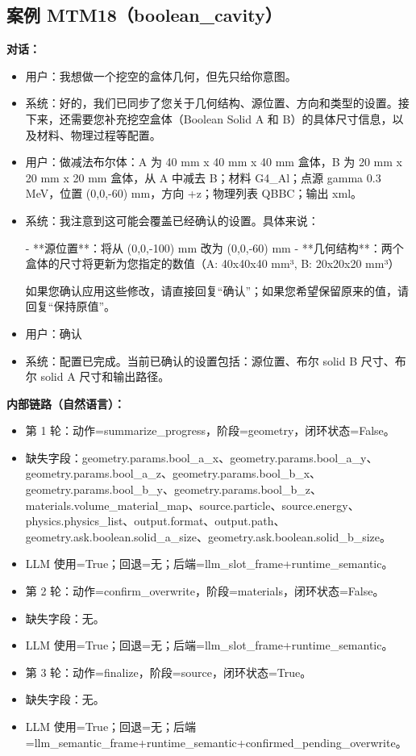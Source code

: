 \documentclass[11pt]{ctexart}
\begin{document}
\subsection{案例 MTM18（boolean\_cavity）}
\textbf{对话：}
\begin{itemize}
\item 用户：我想做一个挖空的盒体几何，但先只给你意图。
\item 系统：好的，我们已同步了您关于几何结构、源位置、方向和类型的设置。接下来，还需要您补充挖空盒体（Boolean Solid A 和 B）的具体尺寸信息，以及材料、物理过程等配置。
\item 用户：做减法布尔体：A 为 40 mm x 40 mm x 40 mm 盒体，B 为 20 mm x 20 mm x 20 mm 盒体，从 A 中减去 B；材料 G4\_Al；点源 gamma 0.3 MeV，位置 (0,0,-60) mm，方向 +z；物理列表 QBBC；输出 xml。
\item 系统：我注意到这可能会覆盖已经确认的设置。具体来说：

- **源位置**：将从 (0,0,-100) mm 改为 (0,0,-60) mm
- **几何结构**：两个盒体的尺寸将更新为您指定的数值（A: 40x40x40 mm³, B: 20x20x20 mm³）

如果您确认应用这些修改，请直接回复“确认”；如果您希望保留原来的值，请回复“保持原值”。
\item 用户：确认
\item 系统：配置已完成。当前已确认的设置包括：源位置、布尔 solid B 尺寸、布尔 solid A 尺寸和输出路径。
\end{itemize}
\textbf{内部链路（自然语言）：}
\begin{itemize}
\item 第 1 轮：动作=summarize\_progress，阶段=geometry，闭环状态=False。
\item 缺失字段：geometry.params.bool\_a\_x、geometry.params.bool\_a\_y、geometry.params.bool\_a\_z、geometry.params.bool\_b\_x、geometry.params.bool\_b\_y、geometry.params.bool\_b\_z、materials.volume\_material\_map、source.particle、source.energy、physics.physics\_list、output.format、output.path、geometry.ask.boolean.solid\_a\_size、geometry.ask.boolean.solid\_b\_size。
\item LLM 使用=True；回退=无；后端=llm\_slot\_frame+runtime\_semantic。
\item 第 2 轮：动作=confirm\_overwrite，阶段=materials，闭环状态=False。
\item 缺失字段：无。
\item LLM 使用=True；回退=无；后端=llm\_slot\_frame+runtime\_semantic。
\item 第 3 轮：动作=finalize，阶段=source，闭环状态=True。
\item 缺失字段：无。
\item LLM 使用=True；回退=无；后端=llm\_semantic\_frame+runtime\_semantic+confirmed\_pending\_overwrite。
\end{itemize}
\end{document}
